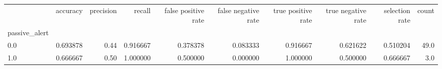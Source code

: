 \begin{tabular}{lrrrrrrrrr}
\toprule
{} &  accuracy &  precision &    recall &  false positive rate &  false negative rate &  true positive rate &  true negative rate &  selection rate &  count \\
passive\_alert &           &            &           &                      &                      &                     &                     &                 &        \\
\midrule
0.0           &  0.693878 &       0.44 &  0.916667 &             0.378378 &             0.083333 &            0.916667 &            0.621622 &        0.510204 &   49.0 \\
1.0           &  0.666667 &       0.50 &  1.000000 &             0.500000 &             0.000000 &            1.000000 &            0.500000 &        0.666667 &    3.0 \\
\bottomrule
\end{tabular}
